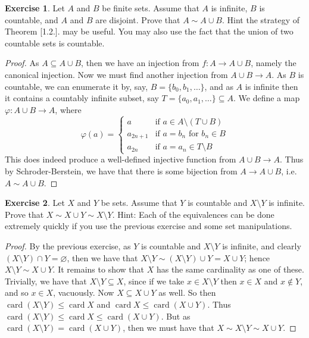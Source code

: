 \documentclass[9pt,reqno]{amsart}
\theoremstyle{definition}
\newtheorem{exercise}{Exercise}[section]
\DeclareMathOperator{\card}{card}
\begin{document}
\begin{exercise}
	Let $A$ and $B$ be finite sets. Assume that $A$ is infinite, $B$ is countable, and $A$ and $B$ are disjoint. Prove that $A \sim A \cup B$. Hint the strategy of Theorem [1.2.]. may be useful. You may also use the fact that the union of two countable sets is countable.  
\end{exercise}
\begin{proof}
	As $A \subseteq A \cup B$, then we have an injection from $f \colon A \to A\cup B$, namely the canonical injection. Now we must find another injection from $A \cup B \to A$. As $B$ is countable, we can enumerate it by, say, $B = \{b_0, b_1, \ldots \}$, and as $A$ is infinite then it contains a countably infinite subset, say $T= \{a_0, a _1, \ldots \} \subseteq A$. We define a map $\varphi \colon A \cup B \to A$, where 
	\[
	\varphi (a) = \begin{cases} a & \text{if } a \in A\setminus (T \cup B) \\
	a_{2n+1} & \text{if } a = b_n \text{ for } b_n \in B \\
	a_{2n} & \text{if } a= a_n \in T\setminus B 
	\end{cases}
	\] This does indeed produce a well-defined injective function from $A \cup B \to A$. Thus by Schroder-Berstein, we have that there is some bijection from $A \to A \cup B$, i.e. $A \sim A \cup B$. 
\end{proof}
\begin{exercise} Let $X$ and $Y$ be sets. Assume that $Y$ is countable and $X \setminus Y$ is infinite. Prove that $X \sim X \cup Y \sim X \setminus Y$. Hint: Each of the equivalences can be done extremely quickly if you use the previous exercise and some set manipulations.
\end{exercise}
\begin{proof}
	By the previous exercise, as $Y$ is countable and $X \setminus Y$ is infinite, and clearly $(X\setminus Y) \cap Y = \varnothing$, then we have that $X \setminus Y \sim (X \setminus Y) \cup Y=X \cup Y$; hence $X \setminus Y \sim X \cup Y$. It remains to show that $X$ has the same cardinality as one of these. Trivially, we have that $X \setminus Y \subseteq X$, since if we take $x \in X \setminus Y$ then $x \in X$ and $x \notin Y$, and so $x \in X$, vacuously. Now $X \subseteq X \cup Y$ as well. So then $ \card (X \setminus Y ) \leq \card X$ and $\card X \leq \card (X\cup Y)$. Thus $\card(X\setminus Y) \leq \card X \leq \card (X \cup Y)$. But as $\card (X\setminus Y) = \card (X\cup Y)$, then we must have that $X \sim X \setminus Y \sim X \cup Y$.
\end{proof}
\end{document}
